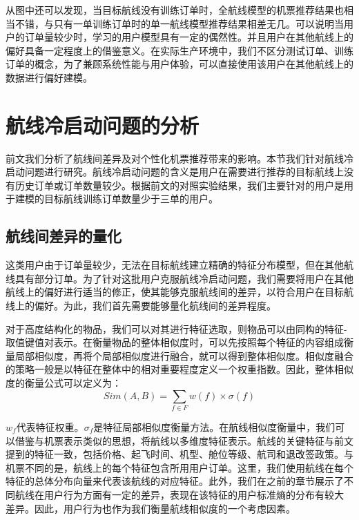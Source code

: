 从图中还可以发现，当目标航线没有训练订单时，全航线模型的机票推荐结果也相当不错，与只有一单训练订单时的单一航线模型推荐结果相差无几。可以说明当用户的订单量较少时，学习的用户模型具有一定的偶然性。并且用户在其他航线上的偏好具备一定程度上的借鉴意义。在实际生产环境中，我们不区分测试订单、训练订单的概念，为了兼顾系统性能与用户体验，可以直接使用该用户在其他航线上的数据进行偏好建模。

\section{航线冷启动问题的分析}
前文我们分析了航线间差异及对个性化机票推荐带来的影响。本节我们针对航线冷启动问题进行研究。航线冷启动问题的含义是用户在需要进行推荐的目标航线上没有历史订单或订单数量较少。根据前文的对照实验结果，我们主要针对的用户是用于建模的目标航线训练订单数量少于三单的用户。

\subsection{航线间差异的量化}

这类用户由于订单量较少，无法在目标航线建立精确的特征分布模型，但在其他航线具有部分订单。为了针对这批用户克服航线冷启动问题，我们需要将用户在其他航线上的偏好进行适当的修正，使其能够克服航线间的差异，以符合用户在目标航线上的偏好。为此，我们首先需要能够量化航线间的差异程度。

对于高度结构化的物品，我们可以对其进行特征选取，则物品可以由同构的特征-取值键值对表示。在衡量物品的整体相似度时，可以先按照每个特征的内容组成衡量局部相似度，再将个局部相似度进行融合，就可以得到整体相似度。相似度融合的策略一般是以特征在整体中的相对重要程度定义一个权重指数。因此，整体相似度的衡量公式可以定义为：
\begin{equation}
\label{eq:line_sim}
	Sim(A,B) = \sum_{f \in F}w(f) \times \sigma(f)
\end{equation}

$w_f$代表特征权重。$\sigma_f$是特征局部相似度衡量方法。在航线相似度衡量中，我们可以借鉴与机票表示类似的思想，将航线以多维度特征表示。航线的关键特征与前文提到的特征一致，包括价格、起飞时间、机型、舱位等级、航司和退改签政策。与机票不同的是，航线上的每个特征包含所用用户订单。这里，我们使用航线在每个特征的总体分布向量来代表该航线的对应特征。此外，我们在之前的章节展示了不同航线在用户行为方面有一定的差异，表现在该特征的用户标准熵的分布有较大
差异。因此，用户行为也作为我们衡量航线相似度的一个考虑因素。

